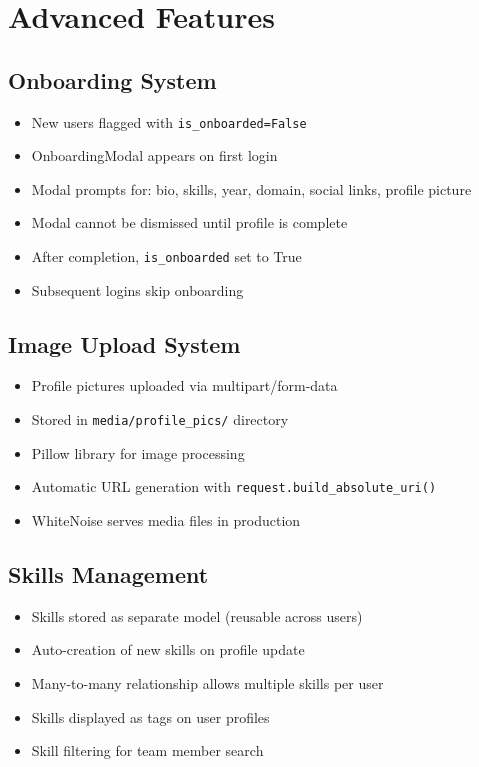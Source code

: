 \documentclass[11pt,a4paper]{article}
\begin{document}
\section{Advanced Features}

\subsection{Onboarding System}
\begin{itemize}[leftmargin=*]
    \item New users flagged with \texttt{is\_onboarded=False}
    \item OnboardingModal appears on first login
    \item Modal prompts for: bio, skills, year, domain, social links, profile picture
    \item Modal cannot be dismissed until profile is complete
    \item After completion, \texttt{is\_onboarded} set to True
    \item Subsequent logins skip onboarding
\end{itemize}

\subsection{Image Upload System}
\begin{itemize}[leftmargin=*]
    \item Profile pictures uploaded via multipart/form-data
    \item Stored in \texttt{media/profile\_pics/} directory
    \item Pillow library for image processing
    \item Automatic URL generation with \texttt{request.build\_absolute\_uri()}
    \item WhiteNoise serves media files in production
\end{itemize}

\subsection{Skills Management}
\begin{itemize}[leftmargin=*]
    \item Skills stored as separate model (reusable across users)
    \item Auto-creation of new skills on profile update
    \item Many-to-many relationship allows multiple skills per user
    \item Skills displayed as tags on user profiles
    \item Skill filtering for team member search
\end{itemize}
\end{document}
